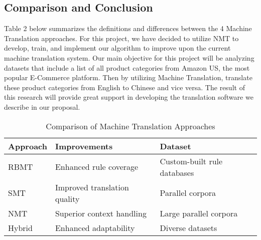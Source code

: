 \documentclass[sigconf]{acmart}
\begin{document}
    \subsection{Comparison and Conclusion}
        Table 2 below summarizes the definitions and differences between the 4 Machine Translation approaches. For this project, we have decided to utilize NMT to develop, train, and implement our algorithm to improve upon the current machine translation system. Our main objective for this project will be analyzing datasets that include a list of all product categories from Amazon US, the most popular E-Commerce platform. Then by utilizing Machine Translation, translate these product categories from English to Chinese and vice versa. The result of this research will provide great support in developing the translation software we describe in our proposal. 
        
        \begin{table}[ht]
            \centering
            \caption{Comparison of Machine Translation Approaches}
            \label{table:mt_comparison}
            \begin{tabular}{|p{0.5in}|p{1.2in}|p{1.2in}|}
                \hline
                \textbf{Approach} &  \textbf{Improvements} & \textbf{Dataset} \\
                \hline
                    RBMT &  Enhanced rule coverage & Custom-built rule databases \\
                \hline
                    SMT &  Improved translation quality & Parallel corpora \\
                \hline
                    NMT &  Superior context handling & Large parallel corpora \\
                \hline
                    Hybrid &  Enhanced adaptability & Diverse datasets \\
                \hline
            \end{tabular}
        \end{table}



    
\end{document}
